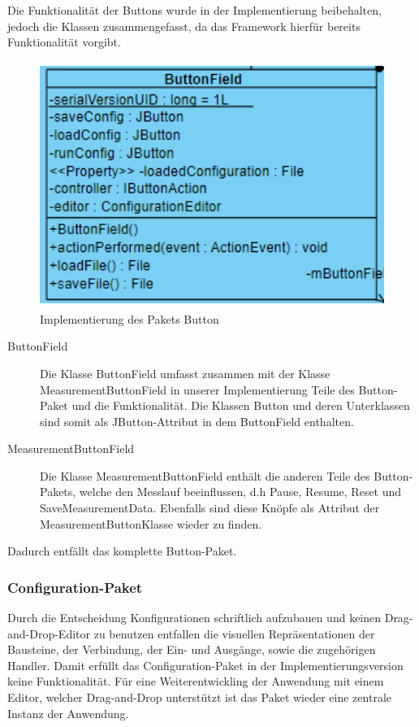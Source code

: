 \documentclass[parskip=full]{scrartcl}
\begin{document}
Die Funktionalität der Buttons wurde in der Implementierung beibehalten, jedoch die Klassen zusammengefasst, da das Framework hierfür bereits Funktionalität vorgibt.

\begin{figure}[htbp]
    \begin{center}
        \includegraphics[height = 8cm]{Grafiken/ButtonField.png}
        \caption{Implementierung des Pakets Button}
        \label{reale}
    \end{center}
\end{figure}


\begin{description}
\item[ButtonField] Die Klasse ButtonField umfasst zusammen mit der Klasse MeasurementButtonField in unserer Implementierung Teile des Button-Paket und die Funktionalität. Die Klassen Button und deren Unterklassen sind somit als
JButton-Attribut in dem ButtonField enthalten. 
\item[MeasurementButtonField] Die Klasse MeasurementButtonField enthält die anderen Teile des Button-Pakets, welche den Messlauf beeinflussen, d.h Pause, Resume, Reset und SaveMeasurementData. Ebenfalls sind diese Knöpfe als Attribut der MeasurementButtonKlasse wieder zu finden.
\end{description}

Dadurch entfällt das komplette Button-Paket.


\subsubsection{Configuration-Paket}

Durch die Entscheidung Konfigurationen schriftlich aufzubauen und keinen Drag-and-Drop-Editor zu benutzen entfallen die visuellen Repräsentationen der Bausteine, der Verbindung, der Ein- und Ausgänge, sowie die zugehörigen Handler. Damit erfüllt das Configuration-Paket in der Implementierungsversion keine Funktionalität. Für eine Weiterentwickling der Anwendung mit einem Editor, welcher Drag-and-Drop unterstützt ist das Paket wieder eine zentrale Instanz der Anwendung. 
\end{document}
